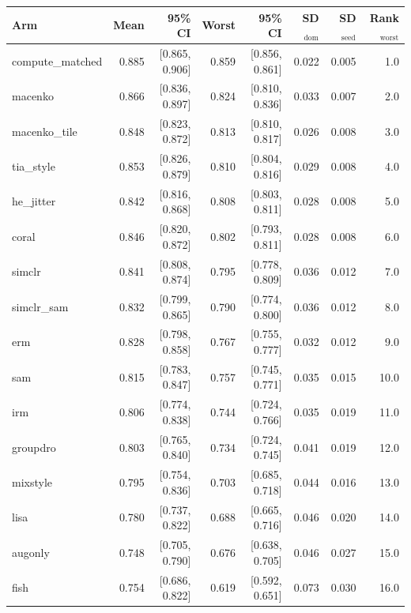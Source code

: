 \begin{tabular}{lrrrrrrr}
\toprule
Arm & Mean & 95\% CI & Worst & 95\% CI & SD$_\text{dom}$ & SD$_\text{seed}$ & Rank$_\text{worst}$ \\
\midrule
compute\_matched & 0.885 & [0.865, 0.906] & 0.859 & [0.856, 0.861] & 0.022 & 0.005 & 1.0 \\
macenko & 0.866 & [0.836, 0.897] & 0.824 & [0.810, 0.836] & 0.033 & 0.007 & 2.0 \\
macenko\_tile & 0.848 & [0.823, 0.872] & 0.813 & [0.810, 0.817] & 0.026 & 0.008 & 3.0 \\
tia\_style & 0.853 & [0.826, 0.879] & 0.810 & [0.804, 0.816] & 0.029 & 0.008 & 4.0 \\
he\_jitter & 0.842 & [0.816, 0.868] & 0.808 & [0.803, 0.811] & 0.028 & 0.008 & 5.0 \\
coral & 0.846 & [0.820, 0.872] & 0.802 & [0.793, 0.811] & 0.028 & 0.008 & 6.0 \\
simclr & 0.841 & [0.808, 0.874] & 0.795 & [0.778, 0.809] & 0.036 & 0.012 & 7.0 \\
simclr\_sam & 0.832 & [0.799, 0.865] & 0.790 & [0.774, 0.800] & 0.036 & 0.012 & 8.0 \\
erm & 0.828 & [0.798, 0.858] & 0.767 & [0.755, 0.777] & 0.032 & 0.012 & 9.0 \\
sam & 0.815 & [0.783, 0.847] & 0.757 & [0.745, 0.771] & 0.035 & 0.015 & 10.0 \\
irm & 0.806 & [0.774, 0.838] & 0.744 & [0.724, 0.766] & 0.035 & 0.019 & 11.0 \\
groupdro & 0.803 & [0.765, 0.840] & 0.734 & [0.724, 0.745] & 0.041 & 0.019 & 12.0 \\
mixstyle & 0.795 & [0.754, 0.836] & 0.703 & [0.685, 0.718] & 0.044 & 0.016 & 13.0 \\
lisa & 0.780 & [0.737, 0.822] & 0.688 & [0.665, 0.716] & 0.046 & 0.020 & 14.0 \\
augonly & 0.748 & [0.705, 0.790] & 0.676 & [0.638, 0.705] & 0.046 & 0.027 & 15.0 \\
fish & 0.754 & [0.686, 0.822] & 0.619 & [0.592, 0.651] & 0.073 & 0.030 & 16.0 \\
\bottomrule
\end{tabular}
